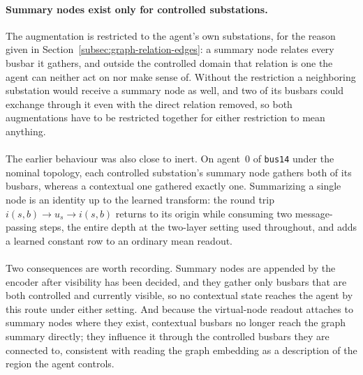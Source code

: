 {\color{clarif}
\paragraph{Summary nodes exist only for controlled substations.}
The augmentation is restricted to the agent's own substations, for the reason
given in Section~\ref{subsec:graph-relation-edges}: a summary node relates every
busbar it gathers, and outside the controlled domain that relation is one the
agent can neither act on nor make sense of. Without the restriction a
neighboring substation would receive a summary node as well, and two of its
busbars could exchange through it even with the direct relation removed, so both
augmentations have to be restricted together for either restriction to mean
anything.
\\
\\
The earlier behaviour was also close to inert. On agent~$0$ of \texttt{bus14}
under the nominal topology, each controlled substation's summary node gathers
both of its busbars, whereas a contextual one gathered exactly one. Summarizing
a single node is an identity up to the learned transform: the round trip
$i(s,b)\rightarrow u_s\rightarrow i(s,b)$ returns to its origin while consuming
two message-passing steps, the entire depth at the two-layer setting used
throughout, and adds a learned constant row to an ordinary mean readout.
\\
\\
Two consequences are worth recording. Summary nodes are appended by the encoder
after visibility has been decided, and they gather only busbars that are both
controlled and currently visible, so no contextual state reaches the agent by
this route under either setting. And because the virtual-node readout attaches
to summary nodes where they exist, contextual busbars no longer reach the graph
summary directly; they influence it through the controlled busbars they are
connected to, consistent with reading the graph embedding as a description of
the region the agent controls.
}
\\
